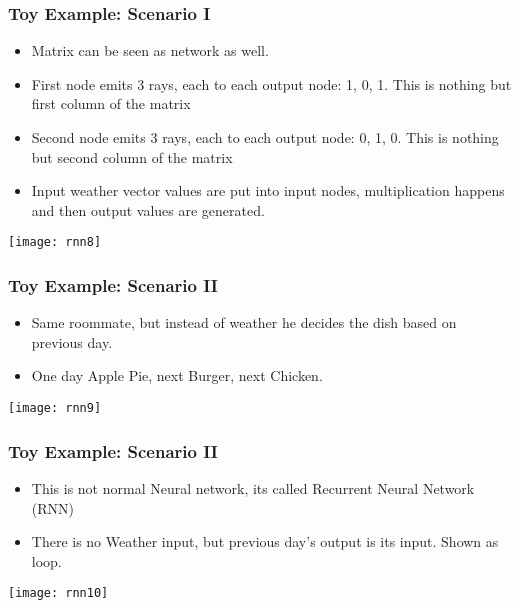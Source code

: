 \begin{frame}[fragile] \frametitle{Toy Example: Scenario I}
\begin{itemize}
\item Matrix can be seen as network as well.
\item First node emits 3 rays, each to each output node: 1, 0, 1. This is nothing but first column of the matrix
\item Second node emits 3 rays, each to each output node: 0, 1, 0. This is nothing but second column of the matrix
\item Input weather vector values are put into input nodes, multiplication happens and then output values are generated.
\end{itemize}
\begin{center}
\texttt{[image: rnn8]}
\end{center}
\end{frame}

\begin{frame}[fragile] \frametitle{Toy Example: Scenario II}

\begin{itemize}
\item Same roommate, but instead of weather he decides the dish based on previous day.
\item One day Apple Pie, next Burger, next Chicken.
\end{itemize}
\begin{center}
\texttt{[image: rnn9]}
\end{center}
\end{frame}

\begin{frame}[fragile] \frametitle{Toy Example: Scenario II}

\begin{itemize}
\item This is not normal Neural network, its called Recurrent Neural Network (RNN)
\item There is no Weather input, but previous day's output is its input. Shown as loop.
\end{itemize}
\begin{center}
\texttt{[image: rnn10]}
\end{center}
\end{frame}


